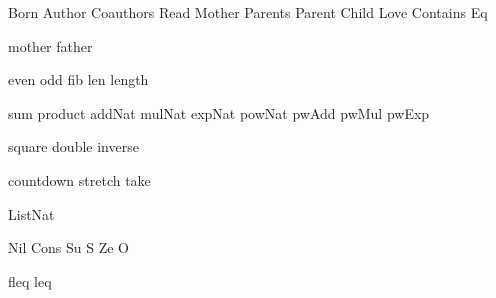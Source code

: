 
\DefRel Born
\DefRel Author
\DefRel Coauthors
\DefRel Read
\DefRel Mother
\DefRel Parents
\DefRel Parent
\DefRel Child
\DefRel Love
\DefRel Contains
\DefRel Eq

\DefFun mother
\DefFun father

\DefFun even
\DefFun odd
\DefFun fib
\DefFun len
\DefFun length

\DefFun sum
\DefFun product
\DefFun addNat
\DefFun mulNat
\DefFun expNat
\DefFun powNat
\DefFun pwAdd
\DefFun pwMul
\DefFun pwExp

\DefFun square
\DefFun double
\DefFun inverse

\DefFpf countdown
\DefFpf stretch
\DefFpf take

\DefType ListNat

\DefCons Nil
\DefCons Cons
\DefCONS Su S
\DefCONS Ze O

\DefFUN fleq leq

\def\bla{\mathrm{bla}}
\def\blu{\mathrm{blu}}

\def\persons{{\cal P}}
\let\pers=\persons

\def\euclid{\algorithmstylize{Euclid}}%

\def\Smile{\rel{\woohoo}}
\def\Frown{\rel{\boohoo}}

\def\oddAs#1{A_{[#1]}}

